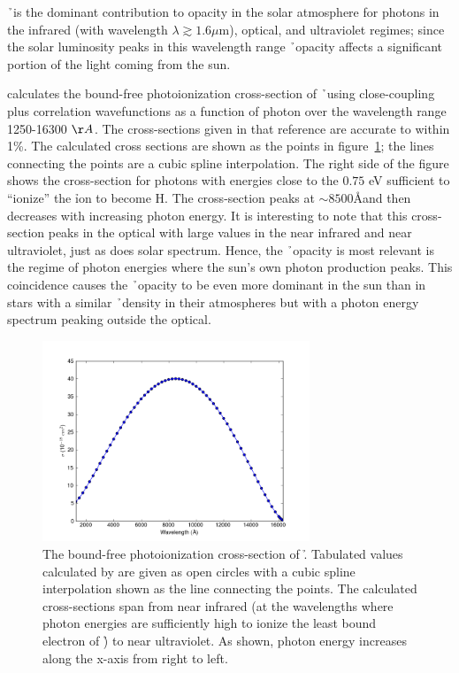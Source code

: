 \h\ is the dominant contribution to opacity in the solar atmosphere for photons in the infrared (with wavelength $\lambda \gtrsim 1.6 \mu$m), optical, and ultraviolet regimes; since the solar luminosity peaks in this wavelength range \h\ opacity affects a significant portion of the light coming from the sun.

\cite{wishart1979} calculates the bound-free photoionization
cross-section of \h\ using close-coupling plus correlation
wavefunctions as a function of photon
over the wavelength range 1250-16300 $\AA$.  The cross-sections given
in that reference are accurate to within 1\%.
The calculated cross sections are shown as the points in
figure~\ref{fig:bfcrosssection}; the lines connecting the points are a
cubic spline interpolation.  The right side of the figure shows the
cross-section for photons with energies close to the $0.75$ eV
sufficient to ``ionize'' the \h ion to become H.  The cross-section
peaks at $\sim 8500$\AA and then decreases with increasing photon
energy.  It is interesting to note that this cross-section peaks in
the optical with large values in the near infrared and near
ultraviolet, just as does solar spectrum.  Hence, the \h\ opacity is
most relevant is the regime of photon energies where the sun's own
photon production peaks.  This coincidence causes the \h\ opacity to
be even more dominant in the sun than in stars with a similar \h\
density in their atmospheres but with a photon energy spectrum peaking
outside the optical.
\begin{figure}
\includegraphics[width=80mm]{figs/boundfree_crosssection.png}
\caption{\label{fig:bfcrosssection}The bound-free photoionization
cross-section of \h. Tabulated values calculated
by \cite{wishart1979} are given as open circles with a cubic spline
interpolation shown as the line connecting the points.  The calculated
cross-sections span from near infrared (at the wavelengths where photon
energies are sufficiently high to ionize the least bound electron
of \h) to near ultraviolet. As shown, photon energy increases along
the x-axis from right to left.}
\end{figure}

